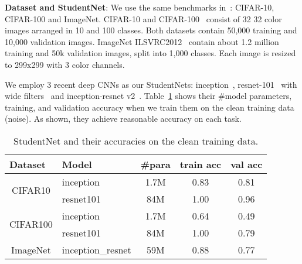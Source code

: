 \documentclass{article}
\begin{document}
\noindent\textbf{Dataset and StudentNet}: We use the same benchmarks in~\cite{zhang2017understanding}: CIFAR-10, CIFAR-100 and ImageNet. CIFAR-10 and CIFAR-100~\cite{krizhevsky2009learning} consist of 32  32 color images arranged in 10 and 100 classes. Both datasets contain 50,000 training and 10,000 validation images. ImageNet ILSVRC2012~\cite{deng2009imagenet} contain about 1.2 million training and 50k validation images, split into 1,000 classes. Each image is resized to 299x299 with 3 color channels.

We employ 3 recent deep CNNs as our StudentNets: inception~\cite{szegedy2016rethinking}, resnet-101~\cite{he2016deep} with wide filters~\cite{zagoruyko2016wide} and inception-resnet v2~\cite{szegedy2017inception}. Table~\ref{tab:studentnet} shows their \#model parameters, training, and validation accuracy when we train them on the clean training data (noise). As shown, they achieve reasonable accuracy on each task.


\begin{table}[ht]
\vspace{-5mm}
\centering
\footnotesize
\caption{\label{tab:studentnet}StudentNet and their accuracies on the clean training data.}
\begin{tabular}{cl|ccc}
\hline
\multicolumn{1}{l}{Dataset} & Model             & \#para & {\footnotesize train acc} & {\footnotesize val acc} \\
\hline
\multirow{2}{*}{CIFAR10}    & {\footnotesize inception}     &1.7M         & 0.83         & 0.81        \\
                            & {\footnotesize resnet101}         & 84M       & 1.00         & 0.96        \\
\hline
\multirow{2}{*}{CIFAR100}   & {\footnotesize inception}     &1.7M              &0.64                &0.49               \\
                            & {\footnotesize resnet101}        & 84M   & 1.00         & 0.79        \\
\hline
\multirow{1}{*}{ImageNet}   & {\footnotesize inception\_resnet}  &59M             & 0.88         & 0.77        \\
\hline
\end{tabular}
\vspace{-3mm}
\end{table}
\end{document}
